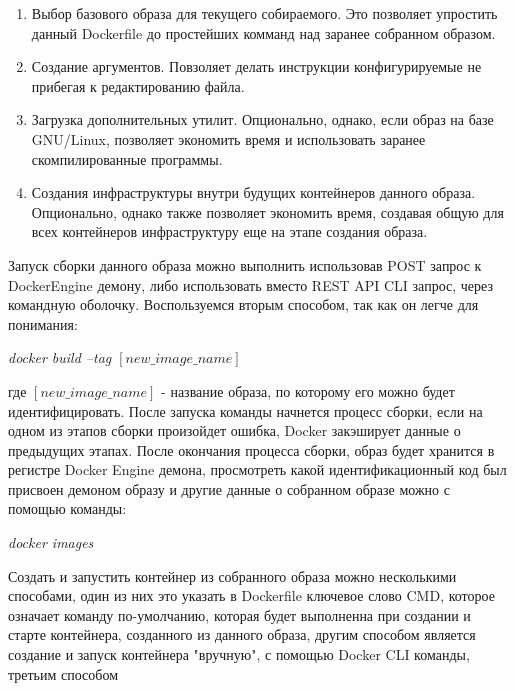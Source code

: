 \documentclass[a4paper, 14pt]{extreport}
\begin{document}
 \begin{enumerate}
        \item Выбор базового образа для текущего собираемого. Это позволяет упростить данный Dockerfile до простейших комманд над 
              заранее собранном образом.
        \item Создание аргументов. Повзоляет делать инструкции конфигурируемые не прибегая к редактированию файла.
        \item Загрузка дополнительных утилит. Опционально, однако, если образ на базе GNU/Linux\cite{unixBook}\cite{unixBook1}, позволяет экономить время и 
              использовать заранее скомпилированные программы.
        \item Создания инфраструктуры внутри будущих контейнеров данного образа. Опционально, однако также позволяет экономить 
              время, создавая общую для всех контейнеров инфраструктуру еще на этапе создания образа.
\end{enumerate}
\par\noindent Запуск сборки данного образа можно выполнить использовав POST запрос к DockerEngine демону, либо использовать вместо 
REST API CLI запрос, через командную оболочку. Воспользуемся вторым способом, так как он легче для понимания:
\begin{center}
        \par \textsl{docker build --tag $\left[new\_image\_name\right]$}
\end{center}
\par\noindent где \(\left[new\_image\_name\right]\) - название образа, по которому его можно будет идентифицировать. После запуска
 команды начнется процесс сборки, если на одном из этапов сборки произойдет ошибка, Docker закэширует данные о предыдущих этапах.
 После окончания процесса сборки, образ будет хранится в регистре Docker Engine демона, просмотреть какой идентификационный код 
 был присвоен демоном образу и другие данные о собранном образе можно с помощью команды:
\begin{center}
        \par \textsl{docker images}
\end{center}
\par\noindent Создать и запустить контейнер из собранного образа можно несколькими способами, один из них это указать в Dockerfile
 ключевое слово CMD, которое означает команду по-умолчанию, которая будет выполненна при создании и старте контейнера, созданного
 из данного образа, другим способом является создание и запуск контейнера "вручную", с помощью Docker CLI команды, третьим способом
\end{document}
